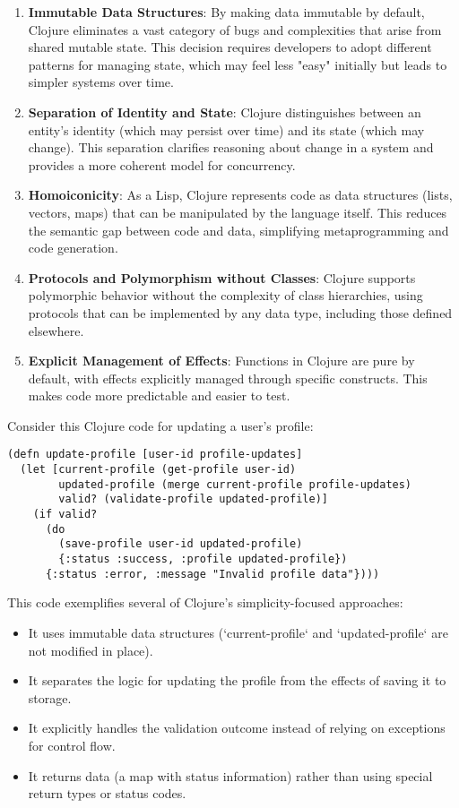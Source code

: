 \documentclass[11pt]{article}
\begin{document}
\begin{enumerate}
\item \textbf{Immutable Data Structures}: By making data immutable by default, Clojure eliminates a vast category of bugs and complexities that arise from shared mutable state. This decision requires developers to adopt different patterns for managing state, which may feel less "easy" initially but leads to simpler systems over time.

\item \textbf{Separation of Identity and State}: Clojure distinguishes between an entity's identity (which may persist over time) and its state (which may change). This separation clarifies reasoning about change in a system and provides a more coherent model for concurrency.

\item \textbf{Homoiconicity}: As a Lisp, Clojure represents code as data structures (lists, vectors, maps) that can be manipulated by the language itself. This reduces the semantic gap between code and data, simplifying metaprogramming and code generation.

\item \textbf{Protocols and Polymorphism without Classes}: Clojure supports polymorphic behavior without the complexity of class hierarchies, using protocols that can be implemented by any data type, including those defined elsewhere.

\item \textbf{Explicit Management of Effects}: Functions in Clojure are pure by default, with effects explicitly managed through specific constructs. This makes code more predictable and easier to test.
\end{enumerate}

Consider this Clojure code for updating a user's profile:

\begin{verbatim}
(defn update-profile [user-id profile-updates]
  (let [current-profile (get-profile user-id)
        updated-profile (merge current-profile profile-updates)
        valid? (validate-profile updated-profile)]
    (if valid?
      (do
        (save-profile user-id updated-profile)
        {:status :success, :profile updated-profile})
      {:status :error, :message "Invalid profile data"})))
\end{verbatim}

This code exemplifies several of Clojure's simplicity-focused approaches:

\begin{itemize}
\item It uses immutable data structures (`current-profile` and `updated-profile` are not modified in place).
\item It separates the logic for updating the profile from the effects of saving it to storage.
\item It explicitly handles the validation outcome instead of relying on exceptions for control flow.
\item It returns data (a map with status information) rather than using special return types or status codes.
\end{itemize}
\end{document}
